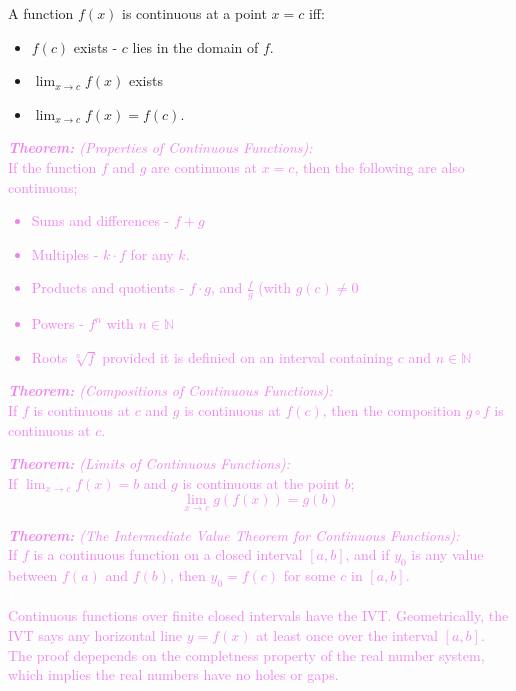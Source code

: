 \documentclass{report}
\newenvironment{theorem}[1][Violet]
  {\begin{tcolorbox}[colframe=#1,colback=white]}
  {\end{tcolorbox}}
\begin{document}
\pagebreak
A function $f(x)$ is continuous at a point $x = c$ iff:
\begin{itemize}
    \item $f(c)$ exists - $c$ lies in the domain of $f$.
    \item $\lim_{x \to c} f(x)$ exists
    \item $\lim_{x \to c} f(x) = f(c)$.\\
\end{itemize}

\begin{theorem}
    \textcolor{Violet}{\textit{\textbf{Theorem:} (Properties of Continuous Functions):}\\
    If the function $f$ and $g$ are continuous at $x = c$, then the following are also continuous;
    \begin{itemize}
        \item Sums and differences - $f + g$
        \item Multiples - $k \cdot f$ for any $k$.
        \item Products and quotients - $f \cdot g$, and $\frac{f}{g}$ (with $g(c) \neq 0$
        \item Powers - $f^n$ with $n \in \mathbb{N}$
        \item Roots $\sqrt[n]{f}$ provided it is definied on an interval containing $c$ and $n \in \mathbb{N}$ 
    \end{itemize}}
\end{theorem}

\begin{theorem}
    \textcolor{Violet}{\textit{\textbf{Theorem:} (Compositions of Continuous Functions):}\\
    If $f$ is continuous at $c$ and $g$ is continuous at $f(c)$, then the composition $g \circ f$ is continuous at $c$.}
\end{theorem}

\begin{theorem}
    \textcolor{Violet}{\textit{\textbf{Theorem:} (Limits of Continuous Functions):}\\
    If $\lim_{x \to c} f(x) = b$ and $g$ is continuous at the point $b$;
    \begin{equation}
        \lim_{x \to c} g(f(x)) = g(b)
    \end{equation}}
\end{theorem}

\begin{theorem}
    \textcolor{Violet}{\textit{\textbf{Theorem:} (The Intermediate Value Theorem for  Continuous Functions):}\\
    If $f$ is a continuous function on a closed interval $[a,b]$, and if $y_0$ is any value between $f(a)$ and $f(b)$, then $y_0 = f(c)$ for some $c$ in $[a,b]$.\\
    \textcolor{White}{123}\\
    Continuous functions over finite closed intervals have the IVT. Geometrically, the IVT says any horizontal line $y=f(x)$ at least once over the interval $[a,b]$. The proof depepends on the completness property of the real number system, which implies the real numbers have no holes or gaps.}
\end{theorem}
\end{document}
